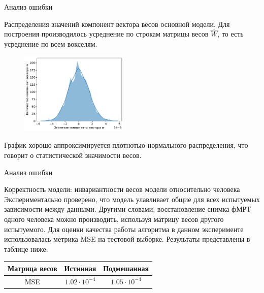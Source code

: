 \documentclass[9pt,pdf]{beamer} %
\begin{document}
\begin{frame}{Анализ ошибки}
\begin{block}{Распределения значений компонент вектора весов основной модели.}
Для построения производилось усреднение по строкам матрицы весов $\hat{W}$, то есть усреднение по всем вокселям.
\begin{figure}[h!]
    \centering
    \includegraphics[width=0.46\textwidth]{mean_weight_distribution.pdf}
    \label{fig:6}
\end{figure}
График хорошо аппроксимируется плотнотью нормального распределения, что говорит о статистической значимости весов.
\end{block}

\end{frame}
\begin{frame}{Анализ ошибки}
\begin{block}{Корректность модели: инвариантности весов модели относительно человека}
Экспериментально проверено, что модель улавливает общие для всех испытуемых зависимости между данными.
Другими словами, восстановление снимка фМРТ одного человека можно производить, используя матрицу весов другого испытуемого. Для оценки качества работы алгоритма в данном эксперименте использовалась метрика MSE на тестовой выборке.
Результаты представлены в таблице ниже:

	\begin{table}[h!]
		\centering
		\begin{tabular}{|c|c|c|}
			\hline
			Матрица весов	&	Истинная	&	Подмешанная \\ \hline \hline
			MSE		& 	$1.02 \cdot 10^{-4}$	 &		$1.05 \cdot 10^{-4}$ \\ \hline
		\end{tabular}
		\label{table_2}
	\end{table}
\end{block}

\end{frame}
\end{document}
